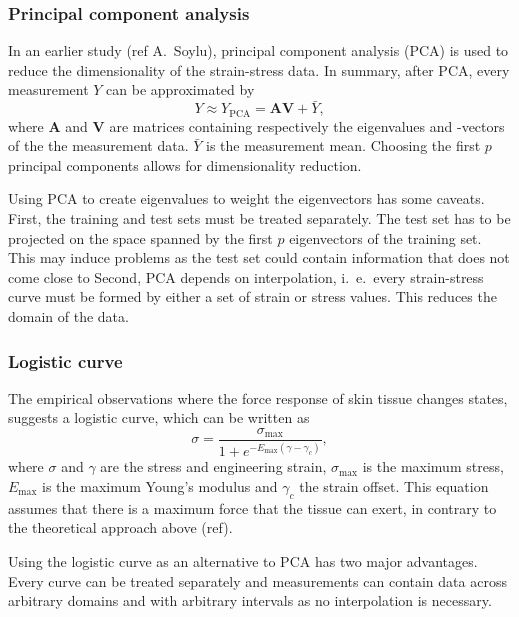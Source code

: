 \subsubsection{Principal component analysis}
In an earlier study (ref A.\ Soylu), principal component analysis (PCA) is used to reduce the dimensionality of the strain-stress data.
In summary, after PCA, every measurement $Y$ can be approximated by
\begin{equation}\label{eq:pca}
    Y \approx Y_\mathrm{PCA} = \mathbf{A} \mathbf{V} + \bar{Y},
\end{equation}
where $\mathbf{A}$ and $\mathbf{V}$ are matrices containing respectively the eigenvalues and -vectors of the the measurement data.
$\bar{Y}$ is the measurement mean.
Choosing the first $p$ principal components allows for dimensionality reduction.

Using PCA to create eigenvalues to weight the eigenvectors has some caveats.
First, the training and test sets must be treated separately.
The test set has to be projected on the space spanned by the first $p$ eigenvectors of the training set.
This may induce problems as the test set could contain information that does not come close to
Second, PCA depends on interpolation, i.\ e.\ every strain-stress curve must be formed by either a set of strain or stress values.
This reduces the domain of the data.

\subsubsection{Logistic curve}
The empirical observations where the force response of skin tissue changes states, suggests a logistic curve, which can be written as
\begin{equation}\label{eq:logistic_curve}
    \sigma = \frac{\sigma_\mathrm{max}}{1+e^{-E_\mathrm{max} (\gamma - \gamma_c)}},
\end{equation}
where $\sigma$ and $\gamma$ are the stress and engineering strain, $\sigma_\mathrm{max}$ is the maximum stress, $E_\mathrm{max}$ is the maximum Young's modulus and $\gamma_c$ the strain offset.
This equation assumes that there is a maximum force that the tissue can exert, in contrary to the theoretical approach above (ref).

Using the logistic curve as an alternative to PCA has two major advantages.
Every curve can be treated separately and measurements can contain data across arbitrary domains and with arbitrary intervals as no interpolation is necessary.


